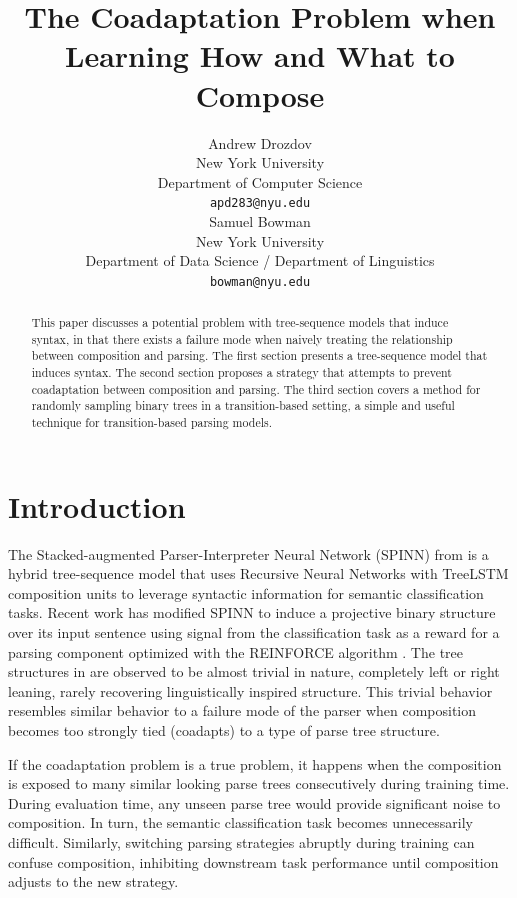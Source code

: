 \documentclass[11pt,a4paper]{article}
\title{The Coadaptation Problem when \\ Learning How and What to Compose}
\author{Andrew Drozdov \\
  New York University \\
  Department of Computer Science \\
  {\tt apd283@nyu.edu} \\\And
  Samuel Bowman \\
  New York University \\
  Department of Data Science / Department of Linguistics \\
  {\tt bowman@nyu.edu} \\}
\date{}
\begin{document}
\maketitle
\begin{abstract}
This paper discusses a potential problem with tree-sequence models that induce syntax,
in that there exists a failure mode when naively treating the relationship between composition and parsing.
The first section presents a tree-sequence model that induces syntax.
The second section proposes a strategy that attempts to prevent coadaptation between composition
and parsing. The third section covers a method for randomly sampling binary trees in a transition-based
setting, a simple and useful technique for transition-based parsing models.
\end{abstract}

\section{Introduction}

The Stacked-augmented Parser-Interpreter Neural Network (SPINN) from \citet{bowman2016fast} is a hybrid tree-sequence model that uses Recursive Neural Networks \citep{socher2011parsing} with TreeLSTM composition units \citep{tai2015improved} to leverage syntactic information for semantic classification tasks. Recent work \citep{yogatama2016learning} has modified SPINN to induce a projective binary structure over its input sentence using signal from the classification task as a reward for a parsing component optimized with the REINFORCE algorithm \citep{williams1992simple}. The tree structures in \citet{yogatama2016learning} are observed to be almost trivial in nature, completely left or right leaning, rarely recovering linguistically inspired structure. This trivial behavior resembles similar behavior to a failure mode of the parser when composition becomes too strongly tied (coadapts) to a type of parse tree structure.

If the coadaptation problem is a true problem, it happens when the composition is exposed to many similar looking parse trees consecutively during training time. During evaluation time, any unseen parse tree would provide significant noise to composition. In turn, the semantic classification task becomes unnecessarily difficult. Similarly, switching parsing strategies abruptly during training can confuse composition, inhibiting downstream task performance until composition adjusts to the new strategy.
\end{document}
